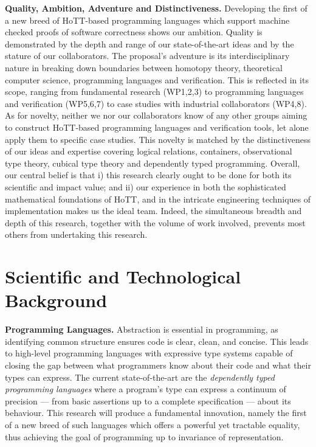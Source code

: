 \documentclass[a4paper,11pt]{article}
\begin{document}
  {\bf Quality, Ambition, Adventure and Distinctiveness.} Developing 
  the first of a new breed of HoTT-based programming languages which
  support machine checked proofs of software correctness shows our
  ambition. Quality is demonstrated by the depth and range of our
  state-of-the-art ideas and by the stature of our collaborators. The
  proposal's adventure is its interdisciplinary nature in breaking
  down boundaries between homotopy theory, theoretical computer
  science, programming languages and verification. This is reflected
  in its scope, ranging from fundamental research (WP1,2,3) to
  programming languages and verification (WP5,6,7) to case studies
  with industrial collaborators (WP4,8). As for novelty, neither we
  nor our collaborators know of any other groups aiming to construct
  HoTT-based programming languages and verification tools, let alone
  apply them to specific case studies. This novelty is matched by the
  distinctiveness of our ideas and expertise covering logical
  relations, containers, observational type theory, cubical type
  theory and dependently typed programming.  Overall, our central
  belief is that i) this research clearly ought to be done for 
  both its scientific and impact value; and ii) our experience in both the
  sophisticated mathematical foundations of HoTT, and in the intricate
  engineering techniques of implementation makes us the ideal team.
  Indeed, the simultaneous breadth and depth of this research,
  together with the volume of work involved, prevents
  most others from undertaking this research.

\vspace*{-0.1in} 
\vspace*{-0.1in} 
\section{Scientific and Technological Background}
\vspace*{-0.1in} 

{\bf Programming Languages.} Abstraction is essential in programming,
as identifying common structure ensures code is clear, clean, and
concise. This leads to high-level programming languages with
expressive type systems capable of closing the gap between what
programmers know about their code and what their types can express.
The current state-of-the-art are the {\em dependently typed
  programming languages} where a program's type can express a
continuum of precision --- from basic assertions up to a complete
specification --- about its behaviour. This research will produce a fundamental
innovation, namely the first of a new breed of such languages which
offers a powerful yet tractable equality, thus
achieving the goal of programming up to invariance of
representation.
\end{document}

